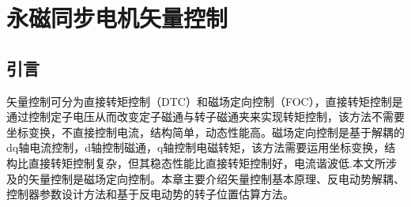 \textit{}\chapter{永磁同步电机矢量控制}\label{ch:FOC}
\section{引言}
矢量控制可分为直接转矩控制（DTC）和磁场定向控制（FOC），直接转矩控制是通过控制定子电压从而改变定子磁通与转子磁通夹来实现转矩控制，该方法不需要坐标变换，不直接控制电流，结构简单，动态性能高。磁场定向控制是基于解耦的dq轴电流控制，d轴控制磁通，q轴控制电磁转矩，该方法需要运用坐标变换，结构比直接转矩控制复杂，但其稳态性能比直接转矩控制好，电流谐波低\cite{del2006comparison,__2008}.本文所涉及的矢量控制是磁场定向控制。本章主要介绍矢量控制基本原理、反电动势解耦、控制器参数设计方法和基于反电动势的转子位置估算方法。

